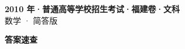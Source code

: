 \documentclass[zihao=-4, a4paper]{ctexart}
\begin{document}
\begin{center}
  {\Large\bfseries 2010 年·普通高等学校招生考试·福建卷·文科}\\[4pt]
  {\large 数学 · 简答版}
\end{center}
\medskip
{}

\clearpage
{}
\begin{center}{\Large\bfseries 答案速查}\end{center}
\medskip

\end{document}
